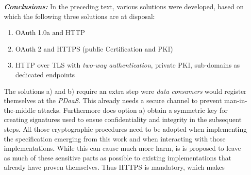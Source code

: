 \documentclass[12pt,english,a4paper,titlepage,cleardoublepage=empty,dottedtoc]{report}
\providecommand{\tightlist}{%
  \setlength{\itemsep}{0pt}\setlength{\parskip}{0pt}}
\begin{document}
\emph{\textbf{Conclusions:}} In the preceding text, various solutions
were developed, based on which the following three solutions are at
disposal:

\begin{enumerate}
\def\labelenumi{\alph{enumi})}
\tightlist
\item
  OAuth 1.0a and HTTP
\item
  OAuth 2 and HTTPS (public Certification and PKI)
\item
  HTTP over TLS with \emph{two-way authentication}, private PKI,
  sub-domains as dedicated endpoints
\end{enumerate}

The solutions a) and b) require an extra step were \emph{data consumers}
would register themselves at the \emph{PDaaS}. This already needs a
secure channel to prevent man-in-the-middle attacks. Furthermore does
option a) obtain a symmetric key for creating signatures used to ensue
confidentiality and integrity in the subsequent steps. All those
cryptographic procedures need to be adopted when implementing the
specification emerging from this work and when interacting with those
implementations. While this can cause much more harm, is is proposed to
leave as much of these sensitive parts as possible to existing
implementations that already have proven themselves. Thus HTTPS is
mandatory, which makes
\end{document}
